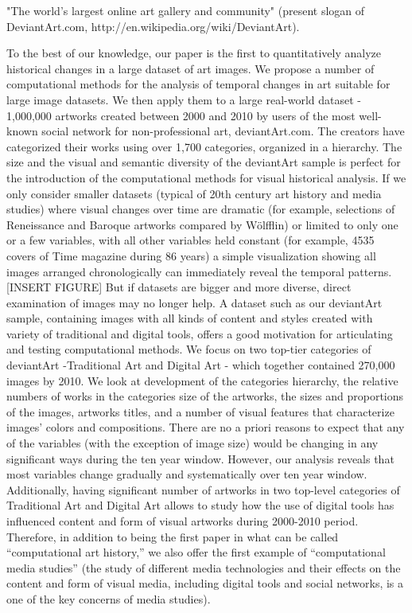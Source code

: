 \documentclass[letterpaper]{article}
\begin{document}
"The world's largest online art gallery and community" (present slogan of DeviantArt.com, http://en.wikipedia.org/wiki/DeviantArt).


To the best of our knowledge, our paper is the first to quantitatively analyze historical changes in a large dataset of art images. We propose a number of computational methods for the analysis of temporal changes in art suitable for large image datasets. We then apply them to a large real-world dataset - 1,000,000 artworks created between 2000 and 2010  by users of the most well-known social network for non-professional art, deviantArt.com. The creators have categorized their works using over 1,700 categories, organized in a hierarchy. 
	The size and the visual and semantic diversity of the deviantArt sample is perfect for the introduction of the computational methods for visual historical analysis. If we only consider smaller datasets (typical of 20th century art history and media studies) where visual changes over time are dramatic (for example, selections of Reneissance and Baroque artworks compared by Wölfflin) or limited to only one or a few variables, with all other variables held constant (for example, 4535 covers of Time magazine during 86 years) a simple visualization showing all images arranged chronologically can immediately reveal the temporal patterns. [INSERT FIGURE] But if datasets are bigger and more diverse, direct examination of images may no longer help. A dataset such as our deviantArt sample, containing images with all kinds of content and styles created with variety of traditional and digital tools, offers a good motivation for articulating and testing computational methods.  
We focus on two top-tier categories of deviantArt -Traditional Art and Digital Art - which together contained 270,000 images by 2010.  We look at development of the categories hierarchy, the relative numbers of works in the categories size of the artworks, the sizes and proportions of the images, artworks titles, and a number of visual features that characterize images’ colors and compositions. There are no a priori reasons to expect that any of the variables (with the exception of image size) would be changing in any significant ways during the ten year window. However, our analysis reveals that most variables change gradually and systematically over ten year window. Additionally, having significant number of artworks in two top-level categories of Traditional Art and Digital Art allows to study how the use of digital tools has influenced content and form of visual artworks during 2000-2010 period. Therefore, in addition to being the first paper in what can be called “computational art history,” we also offer the first example of “computational media studies” (the study of different media technologies and their effects on the content and form of visual media, including digital tools and social networks, is a one of the key concerns of media studies).
\end{document}
